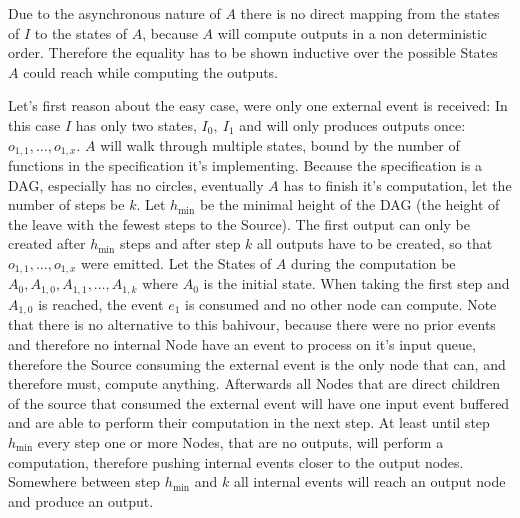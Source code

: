 Due to the asynchronous nature of \(A\) there is no direct mapping from the states of \(I\) to the states of \(A\), because
\(A\) will compute outputs in a non deterministic order.
Therefore the equality has to be shown inductive over the possible States \(A\) could reach while computing the outputs.

Let's first reason about the easy case, were only one external event is received:
In this case \(I\) has only two states, \(I_0,\ I_1\) and will only produces outputs once: \(o_{1,1}, \dots, o_{1,x}\).
\(A\) will walk through multiple states, bound by the number of functions in the specification it's implementing.
Because the specification is a DAG, especially has no circles, eventually \(A\) has to finish it's computation, let the
number of steps be \(k\).
Let \(h_{\min}\) be the minimal height of the DAG (the height of the leave with the fewest steps to the Source).
The first output can only be created after \(h_{\min}\) steps and after step \(k\) all outputs have to be created, so that
\(o_{1,1}, \dots, o_{1,x}\) were emitted.
Let the States of \(A\) during the computation be \(A_{0}, A_{1,0}, A_{1,1}, \dots, A_{1,k}\) where \(A_0\) is the initial state.
When taking the first step and \(A_{1,0}\) is reached, the event \(e_1\) is consumed and no other node can compute.
Note that there is no alternative to this bahivour, because there were no prior events and therefore no internal Node
have an event to process on it's input queue, therefore the Source consuming the external event is the only node that can,
and therefore must, compute anything.
Afterwards all Nodes that are direct children of the source that consumed the external event will have one input event buffered and
are able to perform their computation in the next step.
At least until step \(h_{\min}\) every step one or more Nodes, that are no outputs, will perform a computation, therefore
pushing internal events closer to the output nodes.
Somewhere between step \(h_{\min}\) and \(k\) all internal events will reach an output node and produce an output.

